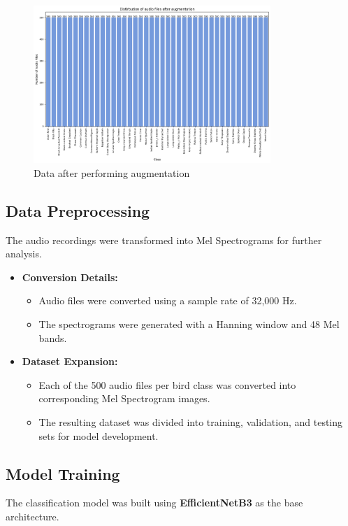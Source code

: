 \begin{figure}[h!]
    \centering
    \includegraphics[width=0.8\textwidth]{images/after_augmentation.png}
    \caption{Data after performing augmentation}
    \label{fig:visualization}
\end{figure}



\newpage

\subsection{Data Preprocessing}
The audio recordings were transformed into Mel Spectrograms for further analysis.  

\begin{itemize}
    \item \textbf{Conversion Details:}  
    \begin{itemize}
        \item Audio files were converted using a sample rate of 32,000 Hz.  
        \item The spectrograms were generated with a Hanning window and 48 Mel bands.  
    \end{itemize}

    \item \textbf{Dataset Expansion:}  
    \begin{itemize}
        \item Each of the 500 audio files per bird class was converted into corresponding Mel Spectrogram images.  
        \item The resulting dataset was divided into training, validation, and testing sets for model development.
    \end{itemize}
\end{itemize}

\subsection{Model Training}  
The classification model was built using \textbf{EfficientNetB3} as the base architecture.  


